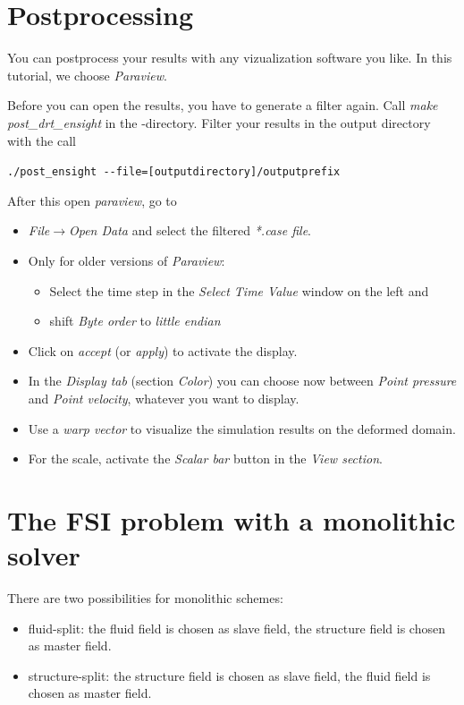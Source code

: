 \section{Postprocessing}
\label{tut_fsi_preexo_2d:postprocess}
You can postprocess your results with any vizualization software you like. In this tutorial, we choose \emph{Paraview}. \newline

Before you can open the results, you have to generate a filter again. Call \emph{make post\_drt\_ensight} in the \baci{}-directory.
Filter your results in the output directory with the call 
\begin{center}
	\verb|./post_ensight --file=[outputdirectory]/outputprefix|
\end{center}
After this open \emph{paraview}, go to

\begin{itemize}
\item \emph{File$\to$Open Data} and select the filtered \emph{{*}.case
file}.
\item Only for older versions of \emph{Paraview}:
  \begin{itemize}
   \item Select the time step in the \emph{Select Time Value} window on the
left and
   \item shift \emph{Byte order} to \emph{little endian}
  \end{itemize}
\item Click on \emph{accept} (or \emph{apply}) to activate the display.
\item In the \emph{Display tab} (section \emph{Color}) you can choose now
between \emph{Point pressure} and \emph{Point velocity}, whatever
you want to display.
\item Use a \emph{warp vector} to visualize the simulation results on the
deformed domain.
\item For the scale, activate the \emph{Scalar bar} button in the \emph{View
section}.
\end{itemize}

\section{The FSI problem with a monolithic solver}
\label{tut_fsi_preexo_2d:monolithic}

There are two possibilities for monolithic schemes:
\begin{itemize}
  \item fluid-split: the fluid field is chosen as slave field, the structure
  field is chosen as master field.
  \item structure-split: the structure field is chosen as slave field, the fluid
  field is chosen as master field.
\end{itemize}


